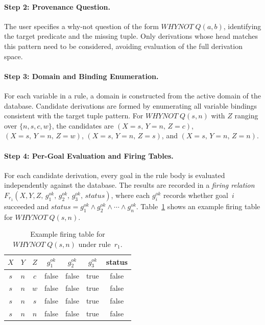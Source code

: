 \documentclass{llncs}
\begin{document}
\paragraph{Step 2: Provenance Question.}
The user specifies a why-not question of the form
$\mathit{WHYNOT}\;Q(a,b)$, identifying the target predicate and the
missing tuple. Only derivations whose head matches this pattern need to
be considered, avoiding evaluation of the full derivation space.

\paragraph{Step 3: Domain and Binding Enumeration.}
For each variable in a rule, a domain is constructed from the active
domain of the database. Candidate derivations are formed by enumerating
all variable bindings consistent with the target tuple pattern.
For $\mathit{WHYNOT}\;Q(s,n)$ with $Z$ ranging over $\{n,s,c,w\}$, the
candidates are $(X{=}s,\,Y{=}n,\,Z{=}c)$, $(X{=}s,\,Y{=}n,\,Z{=}w)$,
$(X{=}s,\,Y{=}n,\,Z{=}s)$, and $(X{=}s,\,Y{=}n,\,Z{=}n)$.

\paragraph{Step 4: Per-Goal Evaluation and Firing Tables.}
For each candidate derivation, every goal in the rule body is evaluated
independently against the database. The results are recorded in a
\emph{firing relation}
$F_{r_1}(X,Y,Z,\,g_1^{\mathit{ok}},\,g_2^{\mathit{ok}},\,g_3^{\mathit{ok}},\,\mathit{status})$,
where each $g_i^{\mathit{ok}}$ records whether goal~$i$ succeeded and
$\mathit{status} = g_1^{\mathit{ok}} \wedge g_2^{\mathit{ok}} \wedge
\cdots \wedge g_n^{\mathit{ok}}$.
Table~\ref{tab:firing} shows an example firing table for
$\mathit{WHYNOT}\;Q(s,n)$.

\begin{table}[t]
\centering
\caption{Example firing table for $\mathit{WHYNOT}\;Q(s,n)$ under rule~$r_1$.}
\label{tab:firing}
\begin{tabular}{ccccccc}
\toprule
$X$ & $Y$ & $Z$ & $g_1^{\mathit{ok}}$ & $g_2^{\mathit{ok}}$ & $g_3^{\mathit{ok}}$ & status \\
\midrule
$s$ & $n$ & $c$ & false & false & true & false \\
$s$ & $n$ & $w$ & false & false & true & false \\
$s$ & $n$ & $s$ & false & false & true & false \\
$s$ & $n$ & $n$ & false & false & true & false \\
\bottomrule
\end{tabular}
\end{table}
\end{document}

